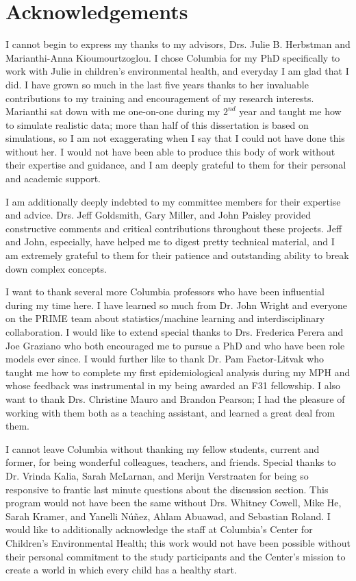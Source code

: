 \chapter{Acknowledgements}

I cannot begin to express my thanks to my advisors, Drs. Julie B. Herbstman and Marianthi-Anna Kioumourtzoglou. I chose Columbia for my PhD specifically to work with Julie in children's environmental health, and everyday I am glad that I did. I have grown so much in the last five years thanks to her invaluable contributions to my training and encouragement of my research interests. Marianthi sat down with me one-on-one during my $2^{nd}$ year and taught me how to simulate realistic data; more than half of this dissertation is based on simulations, so I am not exaggerating when I say that I could not have done this without her. I would not have been able to produce this body of work without their expertise and guidance, and I am deeply grateful to them for their personal and academic support.

I am additionally deeply indebted to my committee members for their expertise and advice. Drs. Jeff Goldsmith, Gary Miller, and John Paisley provided constructive comments and critical contributions throughout these projects. Jeff and John, especially, have helped me to digest pretty technical material, and I am extremely grateful to them for their patience and outstanding ability to break down complex concepts.

I want to thank several more Columbia professors who have been influential during my time here. I have learned so much from Dr. John Wright and everyone on the PRIME team about statistics/machine learning and interdisciplinary collaboration. I would like to extend special thanks to Drs. Frederica Perera and Joe Graziano who both encouraged me to pursue a PhD and who have been role models ever since. I would further like to thank Dr. Pam Factor-Litvak who taught me how to complete my first epidemiological analysis during my MPH and whose feedback was instrumental in my being awarded an F31 fellowship. I also want to thank Drs. Christine Mauro and Brandon Pearson; I had the pleasure of working with them both as a teaching assistant, and learned a great deal from them.

I cannot leave Columbia without thanking my fellow students, current and former, for being wonderful colleagues, teachers, and friends. Special thanks to Dr. Vrinda Kalia, Sarah McLarnan, and Merijn Verstraaten for being so responsive to frantic last minute questions about the discussion section. This program would not have been the same without Drs. Whitney Cowell, Mike He, Sarah Kramer, and Yanelli N\'{u}\~{n}ez, Ahlam Abuawad, and Sebastian Roland. I would like to additionally acknowledge the staff at Columbia's Center for Children's Environmental Health; this work would not have been possible without their personal commitment to the study participants and the Center's mission to create a world in which every child has a healthy start.

